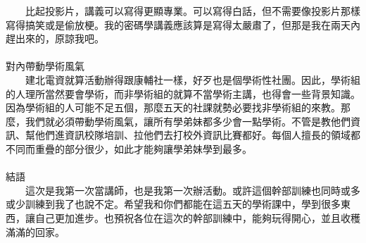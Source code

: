 \documentclass{report}
\begin{document}
　　比起投影片，講義可以寫得更顯專業。可以寫得白話，但不需要像投影片那樣寫得搞笑或是偷放梗。我的密碼學講義應該算是寫得太嚴肅了，但那是我在兩天內趕出來的，原諒我吧。\\
\\{\Large 對內帶動學術風氣}\\
　　建北電資就算活動辦得跟康輔社一樣，好歹也是個學術性社團。因此，學術組的人理所當然要會學術，而非學術組的就算不當學術主講，也得會一些背景知識。因為學術組的人可能不足五個，那麼五天的社課就勢必要找非學術組的來教。那麼，我們就必須帶動學術風氣，讓所有學弟妹都多少會一點學術。不管是教他們資訊、幫他們進資訊校隊培訓、拉他們去打校外資訊比賽都好。每個人擅長的領域都不同而重疊的部分很少，如此才能夠讓學弟妹學到最多。\\
\\{\Large 結語}\\
　　這次是我第一次當講師，也是我第一次辦活動。或許這個幹部訓練也同時或多或少訓練到我了也說不定。希望我和你們都能在這五天的學術課中，學到很多東西，讓自己更加進步。也預祝各位在這次的幹部訓練中，能夠玩得開心，並且收穫滿滿的回家。\\
\end{document}
